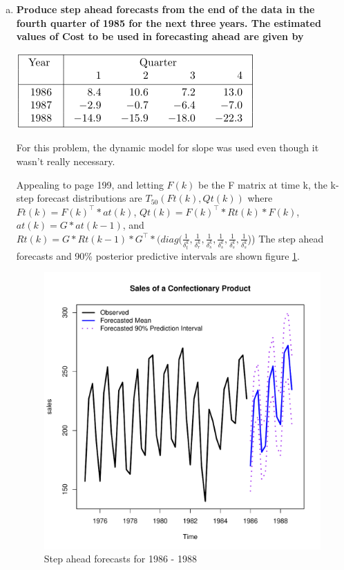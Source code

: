 \documentclass{article}
\begin{document}
\begin{enumerate}[(a)]
		\item \textbf{Produce step ahead forecasts from the end of the data in the fourth quarter of 1985 for the next three years. The estimated values of Cost to be used in forecasting ahead are given by}
		\begin{center}
			\includegraphics[width=0.5\linewidth]{CostFuture}
		\end{center}
		For this problem, the dynamic model for slope was used even though it wasn't really necessary.
		
		Appealing to \cite{harrison1999bayesian} page 199, and letting $F(k)$ be the F matrix at time k, the k-step forecast distributions are $T_{50}(Ft(k),Qt(k))$ where $Ft(k)=F(k)^\top*at(k)$, $Qt(k)=F(k)^\top *Rt(k)*F(k)$,  $at(k)=G*at(k-1)$, and $ Rt(k)=G*Rt(k-1)*G^\top*(diag(\frac{1}{\delta_t^k},\frac{1}{\delta_r^k},\frac{1}{\delta_s^k},\frac{1}{\delta_s^k},\frac{1}{\delta_s^k},\frac{1}{\delta_s^k}$))
		The step ahead forecasts and 90\% posterior predictive intervals are shown figure \ref{fig:stepahead}.
		
		\begin{figure}
			\centering
			\includegraphics[width=0.7\linewidth]{StepAhead}
			\caption{Step ahead forecasts for 1986 - 1988}
			\label{fig:stepahead}
		\end{figure}
		
		
		
	\end{enumerate}

\nocite{prado2010time}
\nocite{harrison1999bayesian}


	
\end{document}
